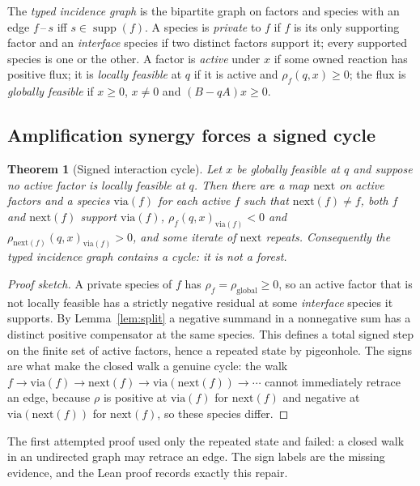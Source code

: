 \documentclass[11pt,a4paper]{article}
\theoremstyle{plain}
\newtheorem{theorem}{Theorem}[section]
\theoremstyle{definition}
\theoremstyle{remark}
\begin{document}
The \emph{typed incidence graph} is the bipartite graph on factors and species with an edge $f\,$--$\,s$ iff $s\in\operatorname{supp}(f)$. A species is \emph{private} to $f$ if $f$ is its only supporting factor and an \emph{interface} species if two distinct factors support it; every supported species is one or the other. A factor is \emph{active} under $x$ if some owned reaction has positive flux; it is \emph{locally feasible} at $q$ if it is active and $\rho_f(q,x)\ge 0$; the flux is \emph{globally feasible} if $x\ge 0$, $x\ne 0$ and $(B-qA)x\ge 0$.

\subsection{Amplification synergy forces a signed cycle}

\begin{theorem}[Signed interaction cycle]\label{thm:signed}
Let $x$ be globally feasible at $q$ and suppose no active factor is locally feasible at $q$. Then there are a map $\mathrm{next}$ on active factors and a species $\mathrm{via}(f)$ for each active $f$ such that $\mathrm{next}(f)\ne f$, both $f$ and $\mathrm{next}(f)$ support $\mathrm{via}(f)$, $\rho_f(q,x)_{\mathrm{via}(f)}<0$ and $\rho_{\mathrm{next}(f)}(q,x)_{\mathrm{via}(f)}>0$, and some iterate of $\mathrm{next}$ repeats. Consequently the typed incidence graph contains a cycle: it is not a forest.
\end{theorem}

\begin{proof}[Proof sketch]
A private species of $f$ has $\rho_f=\rho_{\text{global}}\ge 0$, so an active factor that is not locally feasible has a strictly negative residual at some \emph{interface} species it supports. By Lemma~\ref{lem:split} a negative summand in a nonnegative sum has a distinct positive compensator at the same species. This defines a total signed step on the finite set of active factors, hence a repeated state by pigeonhole. The signs are what make the closed walk a genuine cycle: the walk $f\to\mathrm{via}(f)\to\mathrm{next}(f)\to\mathrm{via}(\mathrm{next}(f))\to\cdots$ cannot immediately retrace an edge, because $\rho$ is positive at $\mathrm{via}(f)$ for $\mathrm{next}(f)$ and negative at $\mathrm{via}(\mathrm{next}(f))$ for $\mathrm{next}(f)$, so these species differ.
\end{proof}

The first attempted proof used only the repeated state and failed: a closed walk in an undirected graph may retrace an edge. The sign labels are the missing evidence, and the Lean proof records exactly this repair.
\end{document}
